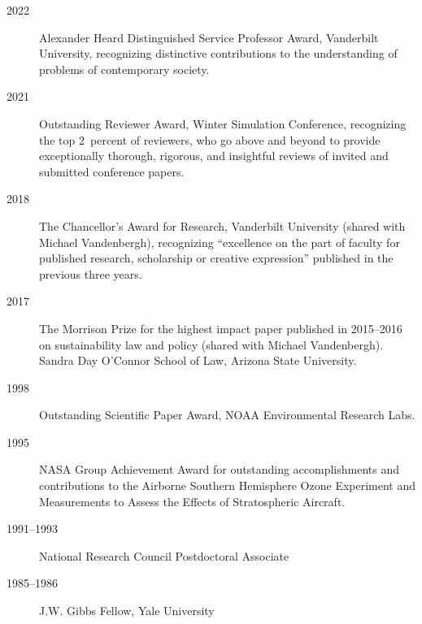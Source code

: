 \begin{description}
\item[2022] Alexander Heard Distinguished Service Professor Award,
  Vanderbilt University, recognizing distinctive contributions to the
  understanding of problems of contemporary society.
\item[2021] Outstanding Reviewer Award, Winter Simulation Conference,
  recognizing the top 2~percent of reviewers, who go above and beyond to provide
  exceptionally thorough, rigorous, and insightful reviews of invited and
  submitted conference papers.
\item[2018] The Chancellor's Award for Research, Vanderbilt University (shared
  with Michael Vandenbergh), recognizing ``excellence on the part of faculty for
  published research, scholarship or creative expression'' published in the
  previous three years.
\item[2017] The Morrison Prize for the highest impact paper published in
  2015--2016 on sustainability law and policy (shared with Michael Vandenbergh).
  Sandra Day O'Connor School of Law, Arizona State University.
\item[1998] Outstanding Scientific Paper Award, NOAA Environmental Research
  Labs.
\item[1995] NASA Group Achievement Award for outstanding accomplishments and
  contributions to the Airborne Southern Hemisphere Ozone Experiment and
  Measurements to Assess the Effects of Stratospheric Aircraft.
\item[1991--1993] National Research Council Postdoctoral Associate
\item[1985--1986] J.W. Gibbs Fellow, Yale University
\end{description}
